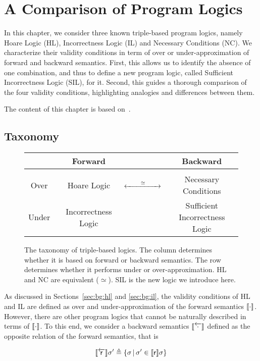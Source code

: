 
\chapter{A Comparison of Program Logics}\label{ch:sil}
In this chapter, we consider three known triple-based program logics, namely Hoare Logic (HL), Incorrectness Logic (IL) and Necessary Conditions (NC). We characterize their validity conditions in term of over or under-approximation of forward and backward semantics. First, this allows us to identify the absence of one combination, and thus to define a new program logic, called Sufficient Incorrectness Logic (SIL), for it. Second, this guides a thorough comparison of the four validity conditions, highlighting analogies and differences between them.

The content of this chapter is based on~\cite{ABGL24}.

\section{Taxonomy}
\begin{figure}[t]
	\centering
	\begin{tabular}{c|ccc}
		& Forward & & Backward\\[3pt]
		\hline &&& \\[-5pt]
		\quad Over\quad\  &\quad Hoare Logic  & $\xleftrightarrow{\qquad\simeq\qquad}$ & Necessary Conditions \\ [5pt]
		\quad Under\quad\  & \quad Incorrectness Logic & & \textcolor{ACMBlue}{Sufficient Incorrectness Logic}
	\end{tabular}
	\caption{The taxonomy of triple-based logics. The column determines whether it is based on forward or backward semantics. The row determines whether it performs under or over-approximation. HL and NC are equivalent ($\simeq$). SIL is the new logic we introduce here.}
	\label{fig:sil:taxonomy}
\end{figure}

As discussed in Sections~\ref{sec:bg:hl} and \ref{sec:bg:il}, the validity conditions of HL and IL are defined as over and under-approximation of the forward semantics $\llbracket\cdot\rrbracket$. However, there are other program logics that cannot be naturally described in terms of $\llbracket\cdot\rrbracket$. To this end, we consider a backward semantics $\llbracket\overleftarrow{\cdot}\rrbracket$ defined as the opposite relation of the forward semantics, that is

\begin{equation}
	\llbracket\overleftarrow{\mathsf{r}}\rrbracket \sigma' \triangleq \{ \sigma \,\vert\, \sigma' \in \llbracket\mathsf{r}\rrbracket \sigma \} \label{eq:sil:bwsem-definition}
\end{equation}

